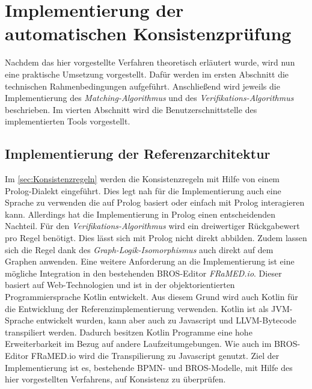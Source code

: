 \chapter{Implementierung der automatischen Konsistenzprüfung}
\label{chap:implementation}

Nachdem das hier vorgestellte Verfahren theoretisch erläutert wurde, wird nun eine praktische Umsetzung vorgestellt.
Dafür werden im ersten Abschnitt die technischen Rahmenbedingungen aufgeführt.
Anschließend wird jeweils die Implementierung des \emph{Matching-Algorithmus} und des \emph{Verifikations-Algorithmus} beschrieben.
Im vierten Abschnitt wird die Benutzerschnittstelle des implementierten Tools vorgestellt.

\section{Implementierung der Referenzarchitektur}

Im \cref{sec:Konsistenzregeln} werden die Konsistenzregeln mit Hilfe von einem Prolog-Dialekt eingeführt.
Dies legt nah für die Implementierung auch eine Sprache zu verwenden die auf Prolog basiert oder einfach mit Prolog interagieren kann.
Allerdings hat die Implementierung in Prolog einen entscheidenden Nachteil.
Für den \emph{Verifikations-Algorithmus} wird ein dreiwertiger Rückgabewert pro Regel benötigt.
Dies lässt sich mit Prolog nicht direkt abbilden.
Zudem lassen sich die Regel dank des \emph{Graph-Logik-Isomorphismus} auch direkt auf dem Graphen anwenden.
Eine weitere Anforderung an die Implementierung ist eine mögliche Integration in den bestehenden BROS-Editor \emph{FRaMED.io}.
Dieser basiert auf Web-Technologien und ist in der objektorientierten Programmiersprache Kotlin entwickelt.
Aus diesem Grund wird auch Kotlin für die Entwicklung der Referenzimplementierung verwenden.
Kotlin ist als JVM-Sprache entwickelt wurden, kann aber auch zu Javascript und LLVM-Bytecode transpiliert werden.
Dadurch besitzen Kotlin Programme eine hohe Erweiterbarkeit im Bezug auf andere Laufzeitumgebungen.
Wie auch im BROS-Editor FRaMED.io wird die Transpilierung zu Javascript genutzt.
Ziel der Implementierung ist es, bestehende BPMN- und BROS-Modelle, mit Hilfe des hier vorgestellten Verfahrens, auf Konsistenz zu überprüfen.

